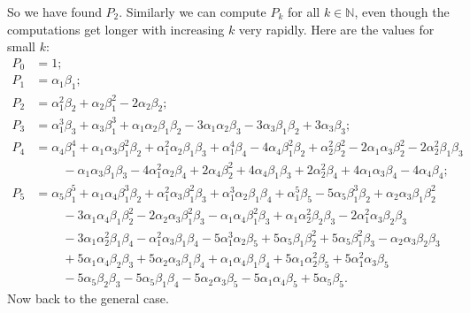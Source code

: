 \documentclass[numbers=enddot,12pt,final,onecolumn,notitlepage]{scrartcl}%
\begin{document}
So we have found $P_{2}$. Similarly we can compute $P_{k}$ for all
$k\in\mathbb{N}$, even though the computations get longer with increasing $k$
very rapidly. Here are the values for small $k$:%
\begin{align*}
P_{0}  &  =1;\\
P_{1}  &  =\alpha_{1}\beta_{1};\\
P_{2}  &  =\alpha_{1}^{2}\beta_{2}+\alpha_{2}\beta_{1}^{2}-2\alpha_{2}%
\beta_{2};\\
P_{3}  &  =\alpha_{1}^{3}\beta_{3}+\alpha_{3}\beta_{1}^{3}+\alpha_{1}%
\alpha_{2}\beta_{1}\beta_{2}-3\alpha_{1}\alpha_{2}\beta_{3}-3\alpha_{3}%
\beta_{1}\beta_{2}+3\alpha_{3}\beta_{3};\\
P_{4}  &  =\alpha_{4}\beta_{1}^{4}+\alpha_{1}\alpha_{3}\beta_{1}^{2}\beta
_{2}+\alpha_{1}^{2}\alpha_{2}\beta_{1}\beta_{3}+\alpha_{1}^{4}\beta
_{4}-4\alpha_{4}\beta_{1}^{2}\beta_{2}+\alpha_{2}^{2}\beta_{2}^{2}-2\alpha
_{1}\alpha_{3}\beta_{2}^{2}-2\alpha_{2}^{2}\beta_{1}\beta_{3}\\
&  \ \ \ \ \ \ \ \ \ \ -\alpha_{1}\alpha_{3}\beta_{1}\beta_{3}-4\alpha_{1}%
^{2}\alpha_{2}\beta_{4}+2\alpha_{4}\beta_{2}^{2}+4\alpha_{4}\beta_{1}\beta
_{3}+2\alpha_{2}^{2}\beta_{4}+4\alpha_{1}\alpha_{3}\beta_{4}-4\alpha_{4}%
\beta_{4};\\
P_{5}  &  =\alpha_{5}\beta_{1}^{5}+\alpha_{1}\alpha_{4}\beta_{1}^{3}\beta
_{2}+\alpha_{1}^{2}\alpha_{3}\beta_{1}^{2}\beta_{3}+\alpha_{1}^{3}\alpha
_{2}\beta_{1}\beta_{4}+\alpha_{1}^{5}\beta_{5}-5\alpha_{5}\beta_{1}^{3}%
\beta_{2}+\alpha_{2}\alpha_{3}\beta_{1}\beta_{2}^{2}\\
&  \ \ \ \ \ \ \ \ \ \ -3\alpha_{1}\alpha_{4}\beta_{1}\beta_{2}^{2}%
-2\alpha_{2}\alpha_{3}\beta_{1}^{2}\beta_{3}-\alpha_{1}\alpha_{4}\beta_{1}%
^{2}\beta_{3}+\alpha_{1}\alpha_{2}^{2}\beta_{2}\beta_{3}-2\alpha_{1}^{2}%
\alpha_{3}\beta_{2}\beta_{3}\\
&  \ \ \ \ \ \ \ \ \ \ -3\alpha_{1}\alpha_{2}^{2}\beta_{1}\beta_{4}-\alpha
_{1}^{2}\alpha_{3}\beta_{1}\beta_{4}-5\alpha_{1}^{3}\alpha_{2}\beta
_{5}+5\alpha_{5}\beta_{1}\beta_{2}^{2}+5\alpha_{5}\beta_{1}^{2}\beta
_{3}-\alpha_{2}\alpha_{3}\beta_{2}\beta_{3}\\
&  \ \ \ \ \ \ \ \ \ \ +5\alpha_{1}\alpha_{4}\beta_{2}\beta_{3}+5\alpha
_{2}\alpha_{3}\beta_{1}\beta_{4}+\alpha_{1}\alpha_{4}\beta_{1}\beta
_{4}+5\alpha_{1}\alpha_{2}^{2}\beta_{5}+5\alpha_{1}^{2}\alpha_{3}\beta_{5}\\
&  \ \ \ \ \ \ \ \ \ \ -5\alpha_{5}\beta_{2}\beta_{3}-5\alpha_{5}\beta
_{1}\beta_{4}-5\alpha_{2}\alpha_{3}\beta_{5}-5\alpha_{1}\alpha_{4}\beta
_{5}+5\alpha_{5}\beta_{5}.
\end{align*}
Now back to the general case.
\end{document}
